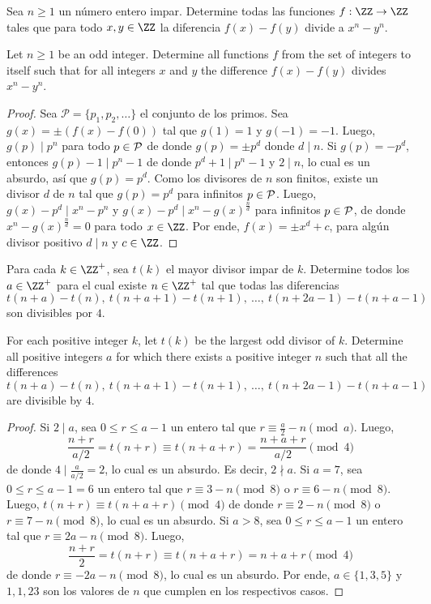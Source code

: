 \begin{probEB}[ISL 2011/N3]
	Sea $n\ge 1$ un número entero impar. Determine todas las funciones $f:\ZZ\to\ZZ$ tales que para todo $x,y\in\ZZ$ la diferencia $f(x)-f(y)$ divide a $x^n-y^n$.
	\begin{hint}
		Let $n\ge 1$ be an odd integer. Determine all functions $f$ from the set of integers to itself such that for all integers $x$ and $y$ the difference $f(x)-f(y)$ divides $x^n-y^n$.
	\end{hint}
\end{probEB}

\begin{proof}
	Sea $\mathcal P=\{p_1,p_2,\dots\}$ el conjunto de los primos. Sea $g(x)=\pm(f(x)-f(0))$ tal que $g(1)=1$ y $g(-1)=-1$. Luego, $g(p)\mid p^n$ para todo $p\in\cal P$ de donde $g(p)=\pm p^d$ donde $d\mid n$. Si $g(p)=-p^d$, entonces $g(p)-1\mid p^n-1$ de donde $p^d+1\mid p^n-1$ y $2\mid n$, lo cual es un absurdo, así que $g(p)=p^d$. Como los divisores de $n$ son finitos, existe un divisor $d$ de $n$ tal que $g(p)=p^d$ para infinitos $p\in\cal P$. Luego, $g(x)-p^d\mid x^n-p^n$ y $g(x)-p^d\mid x^n-g(x)^\frac{n}{d}$ para infinitos $p\in\cal P$, de donde $x^n-g(x)^\frac{n}{d}=0$ para todo $x\in\ZZ$. Por ende, $f(x)=\pm x^d+c$, para algún divisor positivo $d\mid n$ y $c\in\ZZ$.
\end{proof}

\begin{probMB}[ISL 2011/N4]
	Para cada $k\in\ZZ^+$, sea $t(k)$ el mayor divisor impar de $k$. Determine todos los $a\in\ZZ^+$ para el cual existe $n\in\ZZ^+$ tal que todas las diferencias
	\[t(n+a)-t(n),\ t(n+a+1)-t(n+1),\ \dots,\ t(n+2a-1)-t(n+a-1)\]
	son divisibles por $4$.
	\begin{hint}
		For each positive integer $k$, let $t(k)$ be the largest odd divisor of $k$. Determine all positive integers $a$ for which there exists a positive integer $n$ such that all the differences
		\[t(n+a)-t(n),\ t(n+a+1)-t(n+1),\ \dots,\ t(n+2a-1)-t(n+a-1)\]
		are divisible by $4$.
	\end{hint}
\end{probMB}

\begin{proof}
	Si $2\mid a$, sea $0\le r\le a-1$ un entero tal que $r\equiv\frac a2-n\pmod a$. Luego,
	\[\frac{n+r}{a/2}=t(n+r)\equiv t(n+a+r)=\frac{n+a+r}{a/2}\pmod 4\]
	de donde $4\mid\frac{a}{a/2}=2$, lo cual es un absurdo. Es decir, $2\nmid a$. Si $a=7$, sea $0\le r\le a-1=6$ un entero tal que $r\equiv 3-n\pmod 8$ o $r\equiv 6-n\pmod 8$. Luego, $t(n+r)\equiv t(n+a+r)\pmod 4$ de donde $r\equiv 2-n\pmod 8$ o $r\equiv 7-n\pmod 8$, lo cual es un absurdo. Si $a>8$, sea $0\le r\le a-1$ un entero tal que $r\equiv 2a-n\pmod 8$. Luego,
	\[\frac{n+r}{2}=t(n+r)\equiv t(n+a+r)=n+a+r\pmod 4\]
	de donde $r\equiv -2a-n\pmod 8$, lo cual es un absurdo. Por ende, $a\in\{1,3,5\}$ y $1,1,23$ son los valores de $n$ que cumplen en los respectivos casos.
\end{proof}

